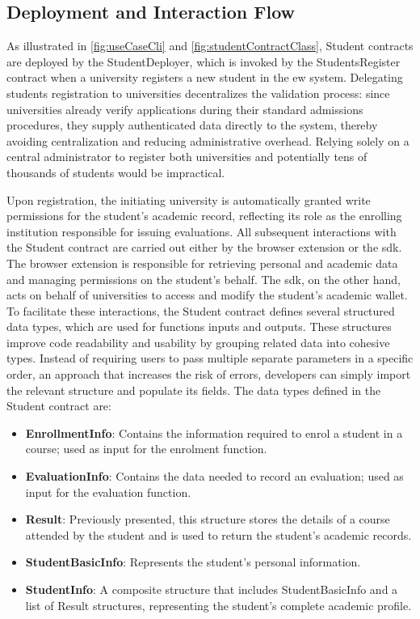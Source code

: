 \subsection{Deployment and Interaction Flow}
As illustrated in \cref{fig:useCaseCli} and \cref{fig:studentContractClass}, Student contracts are deployed by the StudentDeployer, which is invoked by the StudentsRegister contract when a university registers a new student in the \gls{ew} system. Delegating students registration to universities decentralizes the validation process: since universities already verify applications during their standard admissions procedures, they supply authenticated data directly to the system, thereby avoiding centralization and reducing administrative overhead. Relying solely on a central administrator to register both universities and potentially tens of thousands of students would be impractical.

Upon registration, the initiating university is automatically granted write permissions for the student's academic record, reflecting its role as the enrolling institution responsible for issuing evaluations. All subsequent interactions with the Student contract are carried out either by the browser extension or the \gls{sdk}. The browser extension is responsible for retrieving personal and academic data and managing permissions on the student's behalf. The \gls{sdk}, on the other hand, acts on behalf of universities to access and modify the student's academic wallet. To facilitate these interactions, the Student contract defines several structured data types, which are used for functions inputs and outputs. These structures improve code readability and usability by grouping related data into cohesive types. Instead of requiring users to  pass multiple separate parameters in a specific order, an approach that increases the risk of errors, developers can simply import the relevant structure and populate its fields. The data types defined in the Student contract are:

\begin{itemize}
    \item \textbf{EnrollmentInfo}: Contains the information required to enrol a student in a course; used as input for the enrolment function.
    \item \textbf{EvaluationInfo}: Contains the data needed to record an evaluation; used as input for the evaluation function.
    \item \textbf{Result}: Previously presented, this structure stores the details of a course attended by the student and is used to return the student's academic records.
    \item \textbf{StudentBasicInfo}: Represents the student's personal information.
    \item \textbf{StudentInfo}: A composite structure that includes StudentBasicInfo and a list of Result structures, representing the student’s complete academic profile.
\end{itemize}

